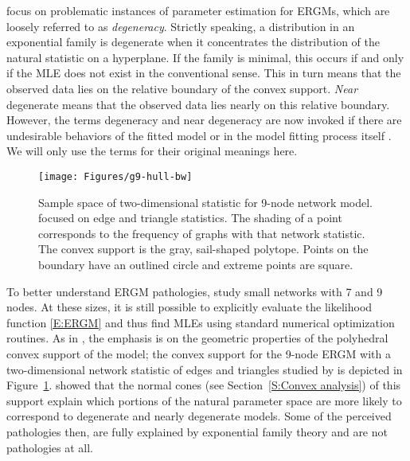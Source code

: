 \citet*{Handcock:degeneracy, Rinaldo:2009} focus on problematic instances of parameter 
estimation for ERGMs, which are loosely referred 
to as \emph{degeneracy}.  Strictly speaking, a distribution in an exponential
family is degenerate when it concentrates the distribution of the natural statistic
on a hyperplane.  If the family is minimal, this occurs if and only if the MLE does not exist in the conventional sense.  This in turn means that the observed
data lies on the relative boundary of the convex support.  \emph{Near} degenerate  
means that the observed data lies nearly on this relative boundary.
However, the terms degeneracy and near degeneracy
are now invoked if there are undesirable behaviors of the fitted model or 
in the model fitting process itself
\citep{Handcock:degeneracy,advancesp*,recentp*,statnet-tutorial}.
We will only use the terms for their original meanings here.   

\begin{figure}[h!]
\centering
\texttt{[image: Figures/g9-hull-bw]}
\caption[Sample space of two-dimensional statistic for 9-node network model]{Sample space 
of two-dimensional statistic for 9-node network model.  \citet{Rinaldo:2009} focused
on edge and triangle statistics.  The shading of a point corresponds to 
the frequency of graphs with that network statistic.  
The convex support is the gray, sail-shaped polytope.  Points on the 
boundary have an outlined circle and extreme points are square.}
\label{F:g9-hull}
\end{figure}

To better understand ERGM pathologies, \citeauthor{Handcock:degeneracy,Rinaldo:2009}
study small networks with 7 and 9 nodes.  At these sizes, it is still 
possible to explicitly evaluate the likelihood function \eqref{E:ERGM} and thus 
find MLEs using standard numerical optimization routines.  
As in \citep{Geyer:gdor}, the emphasis is on the geometric properties of the 
polyhedral convex support of the model;
the convex support for the 9-node ERGM with a two-dimensional network statistic of
edges and triangles
studied by \citeauthor{Rinaldo:2009} is depicted in Figure~\ref{F:g9-hull}.
\citeauthor{Rinaldo:2009} showed that the normal cones (see Section~\ref{S:Convex analysis}) of this support
explain which portions of the natural parameter space are more likely to correspond to 
degenerate and nearly degenerate models.  Some of the perceived pathologies then, 
are fully explained by exponential family theory and are not pathologies at all.

